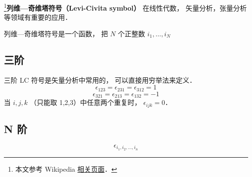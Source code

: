 
\footnote{本文参考 Wikipedia \href{https://en.wikipedia.org/wiki/Levi-Civita_symbol}{相关页面}．}\textbf{列维—奇维塔符号（Levi-Civita symbol）} 在线性代数， 矢量分析，张量分析等领域有重要的应用．

列维—奇维塔符号是一个函数， 把 $N$ 个正整数 $i_1, \dots, i_N$ 

\subsection{三阶}
三阶 LC 符号是矢量分析中常用的， 可以直接用穷举法来定义．
\begin{equation}
\epsilon_{123} = \epsilon_{231} = \epsilon_{312} = 1
\end{equation}
\begin{equation}
\epsilon_{321} = \epsilon_{213} = \epsilon_{132} = -1
\end{equation}
当 $i,j,k$ （只能取 1,2,3）中任意两个重复时， $\epsilon_{ijk} = 0$．

\subsection{N 阶}
\begin{equation}
\epsilon_{i_1,i_2,\dots, i_n}
\end{equation}
